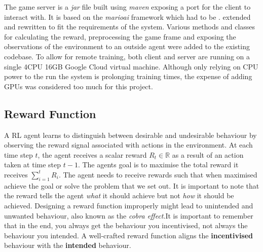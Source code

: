 \documentclass[notitlepage,a4paper,11pt]{article}
\newcommand{\R}{\mathbb{R}}
\begin{document}
The game server is a \textit{jar} file built using \textit{maven} exposing a port for the client to interact with. It is based on the \textit{marioai} \cite{marioai} framework which had to be . extended and rewritten to fit the requirements of the system. Various methods and classes for calculating the reward, preprocessing the game frame and exposing the observations of the environment to an outside agent were added to the existing codebase. To allow for remote training, both client and server are running on a single 4CPU 16GB Google Cloud virtual machine. Although only relying on CPU power to the run the system is prolonging training times, the expense of adding GPUs was considered too much for this project.


\subsection{Reward Function} \label{reward_function}

A RL agent learns to distinguish between desirable and undesirable behaviour by observing the reward signal associated with actions in the environment. At each time step $t$, the agent receives a scalar reward $R_t \in \R$ as a result of an action taken at time step $t-1$. The agents goal is to maximise the total reward it receives $\sum^{t}_{i=1} R_i$. The agent needs to receive rewards such that when maximised achieve the goal or solve the problem that we set out. It is important to note that the reward tells the agent \textit{what} it should achieve but not \textit{how} it should be achieved. Designing a reward function improperly might lead to unintended and unwanted behaviour, also known as the \textit{cobra effect}\cite{siebert2001kobra}.It is important to remember that in the end, you always get the behaviour you incentivised, not always the behaviour you intended. A well-crafted reward function aligns the \textbf{incentivised} behaviour with the \textbf{intended} behaviour.

\end{document}
